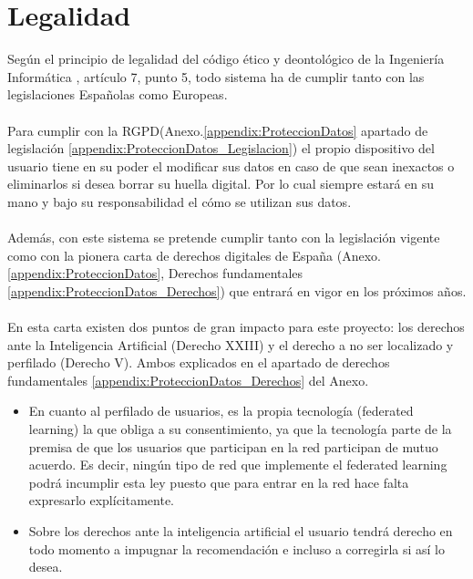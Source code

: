 \section{Legalidad}
Según el principio de legalidad del código ético y deontológico de la Ingeniería Informática \autocite{CodigoEticoDeontologicoa}, artículo 7, punto 5, todo sistema ha de cumplir tanto con las legislaciones Españolas como Europeas. 
\\\\
Para cumplir con la RGPD(Anexo.\ref{appendix:ProteccionDatos} apartado de legislación \ref{appendix:ProteccionDatos_Legislacion}) el propio dispositivo del usuario tiene en su poder el modificar sus datos en caso de que sean inexactos o eliminarlos si desea borrar su huella digital. Por lo cual siempre estará en su mano y bajo su responsabilidad el cómo se utilizan sus datos.
\\\\
Además, con este sistema se pretende cumplir tanto con la legislación vigente como con la pionera carta de derechos digitales de España (Anexo.\ref{appendix:ProteccionDatos}, Derechos fundamentales \ref{appendix:ProteccionDatos_Derechos}) que entrará en vigor en los próximos años. 
\\\\
En esta carta existen dos puntos de gran impacto para este proyecto: los derechos ante la Inteligencia Artificial (Derecho XXIII) y el derecho a no ser localizado y perfilado (Derecho V). Ambos explicados en el apartado de derechos fundamentales \ref{appendix:ProteccionDatos_Derechos} del Anexo.
\begin{itemize}
    \item En cuanto al perfilado de usuarios, es la propia tecnología (federated learning) la que obliga a su consentimiento, ya que la tecnología parte de la premisa de que los usuarios que participan en la red participan de mutuo acuerdo. Es decir, ningún tipo de red que implemente el federated learning podrá incumplir esta ley puesto que para entrar en la red hace falta expresarlo explícitamente.
    \item Sobre los derechos ante la inteligencia artificial el usuario tendrá derecho en todo momento a impugnar la recomendación e incluso a corregirla si así lo desea.
\end{itemize}


